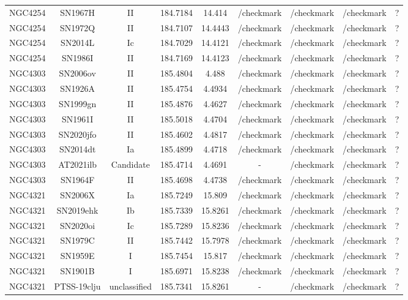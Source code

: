 \begin{table}
\begin{tabular}{ccccccccc}
NGC4254 & SN1967H & II & 184.7184 & 14.414 & /checkmark & /checkmark & /checkmark & ? \\
NGC4254 & SN1972Q & II & 184.7107 & 14.4443 & /checkmark & /checkmark & /checkmark & ? \\
NGC4254 & SN2014L & Ic & 184.7029 & 14.4121 & /checkmark & /checkmark & /checkmark & ? \\
NGC4254 & SN1986I & II & 184.7169 & 14.4123 & /checkmark & /checkmark & /checkmark & ? \\
NGC4303 & SN2006ov & II & 185.4804 & 4.488 & /checkmark & /checkmark & /checkmark & ? \\
NGC4303 & SN1926A & II & 185.4754 & 4.4934 & /checkmark & /checkmark & /checkmark & ? \\
NGC4303 & SN1999gn & II & 185.4876 & 4.4627 & /checkmark & /checkmark & /checkmark & ? \\
NGC4303 & SN1961I & II & 185.5018 & 4.4704 & /checkmark & /checkmark & /checkmark & ? \\
NGC4303 & SN2020jfo & II & 185.4602 & 4.4817 & /checkmark & /checkmark & /checkmark & ? \\
NGC4303 & SN2014dt & Ia & 185.4899 & 4.4718 & /checkmark & /checkmark & /checkmark & ? \\
NGC4303 & AT2021ilb & Candidate & 185.4714 & 4.4691 & - & /checkmark & /checkmark & ? \\
NGC4303 & SN1964F & II & 185.4698 & 4.4738 & /checkmark & /checkmark & /checkmark & ? \\
NGC4321 & SN2006X & Ia & 185.7249 & 15.809 & /checkmark & /checkmark & /checkmark & ? \\
NGC4321 & SN2019ehk & Ib & 185.7339 & 15.8261 & /checkmark & /checkmark & /checkmark & ? \\
NGC4321 & SN2020oi & Ic & 185.7289 & 15.8236 & /checkmark & /checkmark & /checkmark & ? \\
NGC4321 & SN1979C & II & 185.7442 & 15.7978 & /checkmark & /checkmark & /checkmark & ? \\
NGC4321 & SN1959E & I & 185.7454 & 15.817 & /checkmark & /checkmark & /checkmark & ? \\
NGC4321 & SN1901B & I & 185.6971 & 15.8238 & /checkmark & /checkmark & /checkmark & ? \\
NGC4321 & PTSS-19clju & unclassified & 185.7341 & 15.8261 & - & /checkmark & /checkmark & ? \\
\end{tabular}
\end{table}
